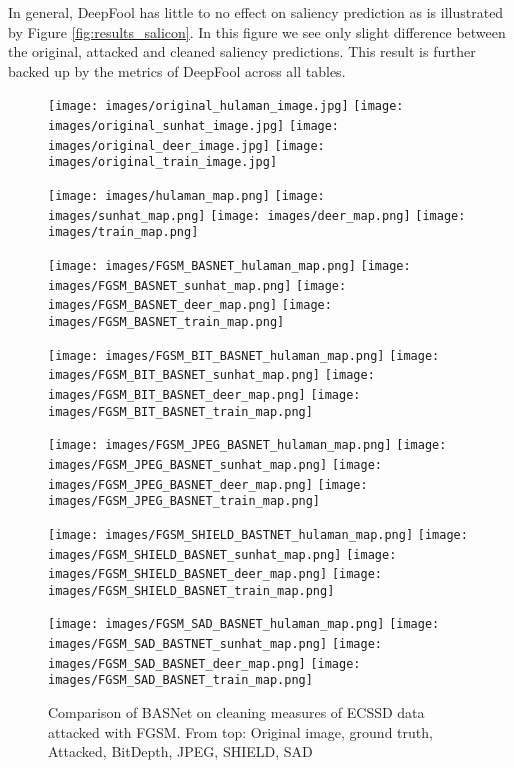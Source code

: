 \documentclass[10pt,twocolumn,letterpaper]{article}
\begin{document}
In general, DeepFool\cite{deepfool} has little to no effect on saliency prediction as is illustrated by Figure \ref{fig:results_salicon}. In this figure we see only slight difference between the original, attacked and cleaned saliency predictions. This result is further backed up by the metrics of DeepFool\cite{deepfool} across all tables. 
\begin{figure}[hbt]

\texttt{[image: images/original\_hulaman\_image.jpg]}
  \texttt{[image: images/original\_sunhat\_image.jpg]}
  \texttt{[image: images/original\_deer\_image.jpg]}
  \texttt{[image: images/original\_train\_image.jpg]}

\texttt{[image: images/hulaman\_map.png]}
  \texttt{[image: images/sunhat\_map.png]}
  \texttt{[image: images/deer\_map.png]}
  \texttt{[image: images/train\_map.png]}
  
\texttt{[image: images/FGSM\_BASNET\_hulaman\_map.png]}
  \texttt{[image: images/FGSM\_BASNET\_sunhat\_map.png]}
  \texttt{[image: images/FGSM\_BASNET\_deer\_map.png]}
  \texttt{[image: images/FGSM\_BASNET\_train\_map.png]}
  
\texttt{[image: images/FGSM\_BIT\_BASNET\_hulaman\_map.png]}
  \texttt{[image: images/FGSM\_BIT\_BASNET\_sunhat\_map.png]}
  \texttt{[image: images/FGSM\_BIT\_BASNET\_deer\_map.png]}
  \texttt{[image: images/FGSM\_BIT\_BASNET\_train\_map.png]}
  
\texttt{[image: images/FGSM\_JPEG\_BASNET\_hulaman\_map.png]}
  \texttt{[image: images/FGSM\_JPEG\_BASNET\_sunhat\_map.png]}
  \texttt{[image: images/FGSM\_JPEG\_BASNET\_deer\_map.png]}
  \texttt{[image: images/FGSM\_JPEG\_BASNET\_train\_map.png]}
  
\texttt{[image: images/FGSM\_SHIELD\_BASTNET\_hulaman\_map.png]}
  \texttt{[image: images/FGSM\_SHIELD\_BASNET\_sunhat\_map.png]}
  \texttt{[image: images/FGSM\_SHIELD\_BASNET\_deer\_map.png]}
  \texttt{[image: images/FGSM\_SHIELD\_BASNET\_train\_map.png]}
  
\texttt{[image: images/FGSM\_SAD\_BASNET\_hulaman\_map.png]}
    \texttt{[image: images/FGSM\_SAD\_BASTNET\_sunhat\_map.png]}
    \texttt{[image: images/FGSM\_SAD\_BASNET\_deer\_map.png]}
    \texttt{[image: images/FGSM\_SAD\_BASNET\_train\_map.png]}
  
  
  
  \caption{Comparison of BASNet\cite{BASNet} on cleaning measures of ECSSD\cite{ECSSD} data attacked with FGSM.
             From top: Original image, ground truth, Attacked, BitDepth, JPEG, SHIELD\cite{das2018shield}, SAD
  }
  \label{fig:results_ecssd}
\end{figure}
\end{document}
